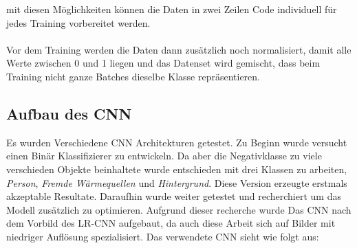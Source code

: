 \noindent mit diesen Möglichkeiten können die Daten in zwei Zeilen Code individuell für jedes Training vorbereitet werden.\\
\\
Vor dem Training werden die Daten dann zusätzlich noch normalisiert, damit alle Werte zwischen 0 und 1 liegen und das Datenset wird gemischt, dass beim Training nicht ganze Batches dieselbe Klasse repräsentieren.

\subsection{Aufbau des CNN}

Es wurden Verschiedene \gls{CNN} Architekturen getestet. Zu Beginn wurde versucht einen Binär Klassifizierer zu entwickeln. Da aber die Negativklasse zu viele verschieden Objekte beinhaltete wurde entschieden mit drei Klassen zu arbeiten, \textit{Person}, \textit{Fremde Wärmequellen} und \textit{Hintergrund}. Diese Version erzeugte erstmals akzeptable Resultate. Daraufhin wurde weiter getestet und recherchiert um das Modell zusätzlich zu optimieren. Aufgrund dieser recherche wurde Das \gls{CNN} nach dem Vorbild des LR-CNN \parencite{cnnArchitecture} aufgebaut, da auch diese Arbeit sich auf Bilder mit niedriger Auflösung spezialisiert. Das verwendete CNN sieht wie folgt aus:


